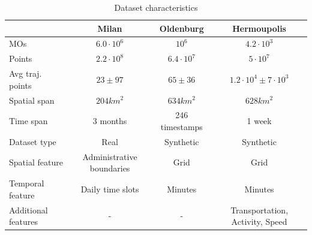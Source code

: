 \documentclass[
]{ceurart}
\renewcommand{\sf}[1]{\textsf{\textup{#1}}}
\begin{document}

\begin{table}[t]
  \scriptsize\centering
  \caption{Dataset characteristics}
  \label{tab:datasets}%
    \begin{tabular}{l|ccc}
    \toprule
     & \sf{Milan} & \sf{Oldenburg} & \sf{Hermoupolis}\\
    \midrule
    MOs & $6.0 \cdot 10^6$ & $10^6$ & $4.2 \cdot 10^3$ \\
    Points & $2.2 \cdot 10^8$ & $6.4 \cdot 10^7$ & $5 \cdot 10^7$ \\
    Avg traj. points & $23 \pm 97$ & $65 \pm 36$ & $1.2 \cdot 10^4 \pm 7 \cdot 10^3$ \\
    Spatial span & $204 km^2$ & $634 km^2$ & $628 km^2$  \\
    Time span & 3 months & 246 timestamps & 1 week \\
    \midrule
    Dataset type & Real & Synthetic & Synthetic \\
    Spatial feature & Administrative boundaries & Grid  & Grid \\
    Temporal feature & Daily time slots & Minutes & Minutes \\
    Additional features & - & - & Transportation, Activity, Speed \\
    \bottomrule
    \end{tabular}%
    \label{tab:features}%
\end{table}%
\end{document}
